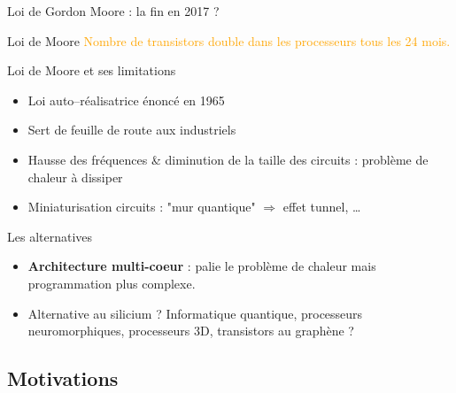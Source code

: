 \documentclass[handout]{beamer}
\begin{document}
\begin{frame}[fragile]{Loi de Gordon Moore : la fin en 2017 ?}

\begin{block}{Loi de Moore}
\textcolor{orange}{Nombre de transistors double dans les processeurs tous les 24 mois.}
\end{block}

\begin{block}{Loi de Moore et ses limitations}
\begin{itemize}
 \item Loi auto--réalisatrice énoncé en 1965 
 \item Sert de feuille de route aux industriels
 \item Hausse des fréquences \& diminution de la taille des circuits : \alert{problème de chaleur à dissiper}
 \item Miniaturisation circuits : "mur quantique" $\Rightarrow$ effet tunnel, \ldots
\end{itemize}
\end{block}

\begin{block}{Les alternatives}
\begin{itemize}
 \item \textbf{Architecture multi-coeur}  : palie le problème de chaleur mais programmation plus complexe.
 \item Alternative au silicium ? Informatique quantique, processeurs neuromorphiques, processeurs 3D, transistors au graphène ?
\end{itemize} 
\end{block}

\end{frame}

\subsection{Motivations}
\end{document}
